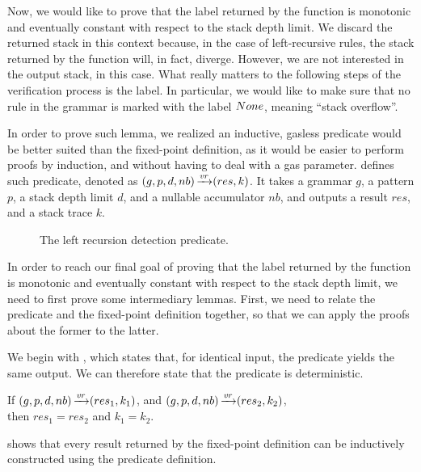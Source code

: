 Now, we would like to
prove that the label returned by the \textit{\verifyrulename{}} function
is monotonic and eventually constant with respect to the
stack depth limit.
We discard the returned stack in this context because,
in the case of left-recursive rules,
the stack returned by the function will,
in fact,
diverge.
However, we are not interested in
the output stack, in this case.
What really matters to the following
steps of the verification process
is the label.
In particular, we would like to make sure
that no rule in the grammar is marked
with the label $None$,
meaning ``stack overflow''.

In order to prove such lemma,
we realized an inductive, gasless predicate
would be better suited
than the fixed-point definition,
as it would be easier to perform proofs by induction,
and without having to deal with a gas parameter.
defines such predicate,
denoted as $(g,p,d,nb) \operatorname{\xrightarrow{\mathit{vr}}} (res,k)$.
It takes a grammar $g$,
a pattern $p$,
a stack depth limit $d$,
and a nullable accumulator $nb$,
and outputs a result $res$,
and a stack trace $k$.

\begin{figure}
    
    \caption{The left recursion detection predicate.}
    \label{fig:verifyrule}
\end{figure}

In order to reach our final goal
of proving that the label returned
by the \textit{\verifyrulename{}} function
is monotonic and eventually constant
with respect to the stack depth limit,
we need to first prove some intermediary lemmas.
First, we need to relate the predicate and
the fixed-point definition together,
so that we can apply the proofs about the
former to the latter.

We begin with
,
which states that,
for identical input,
the predicate yields the same output.
We can therefore state
that the predicate is deterministic.

\begin{lemma}
    If $(g,p,d,nb) \operatorname{\xrightarrow{\mathit{vr}}} (res_1,k_1)$,
    and $(g,p,d,nb) \operatorname{\xrightarrow{\mathit{vr}}} (res_2,k_2)$, \\
    then $res_1 = res_2$ and $k_1 = k_2$.
    \label{lemma:vr-determinism}
\end{lemma}

 shows that
every result returned by the fixed-point definition
can be inductively constructed using the predicate definition.

